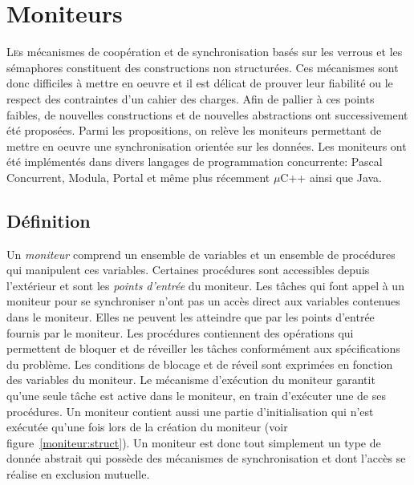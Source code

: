 \chapter{Moniteurs}
\startchapter
\lettrine[lines=3]{L}es mécanismes de coopération et de synchronisation basés sur les verrous et les sémaphores constituent des constructions non structurées. Ces mécanismes sont donc difficiles à mettre en oeuvre et il est délicat de prouver leur fiabilité ou le respect des contraintes d'un cahier des charges. Afin de pallier à ces points faibles, de nouvelles constructions et de nouvelles abstractions ont successivement été proposées. Parmi les propositions, on relève les moniteurs permettant de mettre en oeuvre une synchronisation orientée sur les données. Les moniteurs ont été implémentés dans divers langages de programmation concurrente: Pascal Concurrent, Modula, Portal et même plus récemment $\mu$C++ ainsi que Java.

\section{Définition}
Un {\em moniteur} comprend un ensemble de variables et un ensemble de procédures qui manipulent ces variables. Certaines procédures sont accessibles depuis l'extérieur et sont les {\em points d'entrée} du moniteur. Les tâches qui font appel à un moniteur pour se synchroniser n'ont pas un accès direct aux variables contenues dans le moniteur. Elles ne peuvent les atteindre que par les points d'entrée fournis par le moniteur. Les procédures contiennent des opérations qui permettent de bloquer et de réveiller les tâches conformément aux spécifications du problème. Les conditions de blocage et de réveil sont exprimées en fonction des variables du moniteur. Le mécanisme d'exécution du moniteur garantit qu'une seule tâche est active dans le moniteur, en train d'exécuter une de ses procédures. Un moniteur contient aussi une partie d'initialisation qui n'est exécutée qu'une fois lors de la création du moniteur (voir figure~\ref{moniteur:struct}). Un moniteur est donc tout simplement un type de donnée abstrait qui possède des mécanismes de synchronisation et dont l'accès se réalise en exclusion mutuelle.

